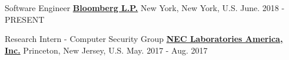 

\begin{cventries}

\cventry
{Software Engineer} %
{\href{http://www.bloomberg.com/}{\bf Bloomberg L.P.}}  %
{New York, New York, U.S.} %
{June. 2018 - PRESENT} %
{
}
\vspace{-5mm}

\cventry
{Research Intern - Computer Security Group} %
{\href{http://www.nec-labs.com/}{\bf NEC Laboratories America, Inc.}}  %
{Princeton, New Jersey, U.S.} %
{May. 2017 - Aug. 2017} %
{
}
\vspace{-5mm}	
	

\end{cventries}
